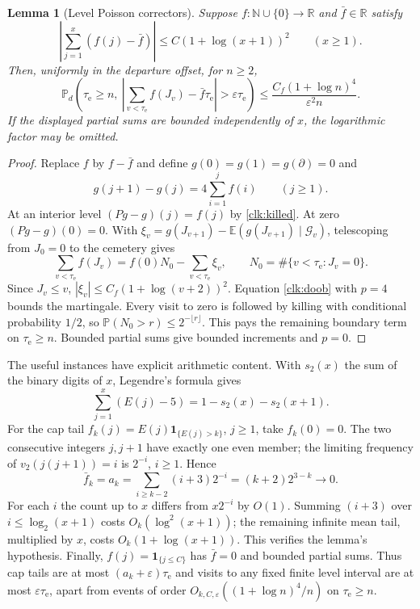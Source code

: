 \documentclass[11pt]{amsart}
\newtheorem{lemma}[theorem]{Lemma}
\theoremstyle{definition}
\theoremstyle{remark}
\newcommand{\N}{\mathbb N}
\newcommand{\R}{\mathbb R}
\newcommand{\E}{\mathbb E}
\newcommand{\PP}{\mathbb P}
\newcommand{\one}{\mathbf 1}
\begin{document}
\begin{lemma}[Level Poisson correctors]\label{clk:level-corrector}
Suppose $f:\N\cup\{0\}\to\R$ and $\bar f\in\R$ satisfy
\[
 \left|\sum_{j=1}^x(f(j)-\bar f)\right|
       \le C(1+\log(x+1))^2\qquad(x\ge1).
\]
Then, uniformly in the departure offset, for $n\ge2$,
\begin{equation}\label{clk:level-bound}
 \PP_d\left(\tau_{\mathrm e}\ge n,\
  \left|\sum_{v<\tau_{\mathrm e}}f(J_v)-\bar f \tau_{\mathrm e}\right|>\varepsilon \tau_{\mathrm e}\right)
 \le \frac{C_f(1+\log n)^4}{\varepsilon^2n}.
\end{equation}
If the displayed partial sums are bounded independently of $x$, the
logarithmic factor may be omitted.
\end{lemma}
\begin{proof}
Replace $f$ by $f-\bar f$ and define
$g(0)=g(1)=g(\partial)=0$ and
\[
 g(j+1)-g(j)=4\sum_{i=1}^jf(i)\qquad(j\ge1).
\]
At an interior level $(Pg-g)(j)=f(j)$ by \eqref{clk:killed}. At zero
$(Pg-g)(0)=0$. With
$\xi_v=g(J_{v+1})-\E(g(J_{v+1})\mid\mathcal G_v)$, telescoping
from $J_0=0$ to the cemetery gives
\[
 \sum_{v<\tau_{\mathrm e}}f(J_v)=f(0)N_0-\sum_{v<\tau_{\mathrm e}}\xi_v,
 \qquad N_0=\#\{v<\tau_{\mathrm e}:J_v=0\}.
\]
Since $J_v\le v$, $|\xi_v|\le C_f(1+\log(v+2))^2$. Equation
\eqref{clk:doob} with $p=4$ bounds the martingale. Every visit to zero
is followed by killing with conditional probability $1/2$, so
$\PP(N_0>r)\le2^{-\lfloor r\rfloor}$. This pays the remaining
boundary term on $\tau_{\mathrm e}\ge n$. Bounded partial sums give bounded
increments and $p=0$.
\end{proof}

The useful instances have explicit arithmetic content. With $s_2(x)$
the sum of the binary digits of $x$, Legendre's formula gives
\begin{equation}\label{clk:legendre-epoch}
 \sum_{j=1}^x(E(j)-5)=1-s_2(x)-s_2(x+1).
\end{equation}
For the cap tail $f_k(j)=E(j)\one_{\{E(j)>k\}}$, $j\ge1$, take
$f_k(0)=0$. The two consecutive integers $j,j+1$ have exactly one even
member; the limiting frequency of $v_2(j(j+1))=i$ is $2^{-i}$,
$i\ge1$. Hence
\begin{equation}\label{clk:ak}
 \bar f_k=a_k=\sum_{i\ge k-2}(i+3)2^{-i}
                   =(k+2)2^{3-k}\longrightarrow0.
\end{equation}
For each $i$ the count up to $x$ differs from $x2^{-i}$ by $O(1)$.
Summing $(i+3)$ over $i\le\log_2(x+1)$ costs $O_k(\log^2(x+1))$;
the remaining infinite mean tail, multiplied by $x$, costs
$O_k(1+\log(x+1))$. This verifies the lemma's hypothesis. Finally,
$f(j)=\one_{\{j\le C\}}$ has $\bar f=0$ and bounded partial sums.
Thus cap tails are at most $(a_k+\varepsilon)\tau_{\mathrm e}$ and visits to any
fixed finite level interval are at most $\varepsilon \tau_{\mathrm e}$, apart from
events of order $O_{k,C,\varepsilon}((1+\log n)^4/n)$ on $\tau_{\mathrm e}\ge n$.
\end{document}
